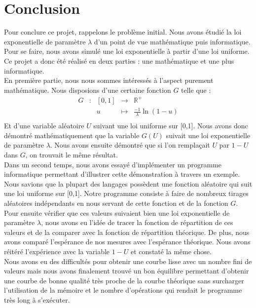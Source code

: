 \documentclass[12,french]{report}
\begin{document}
\chapter*{Conclusion}

Pour conclure ce projet, rappelons le problème initial. Nous avons étudié la loi exponentielle de paramètre $\lambda$ d'un point de vue mathématique puis informatique. Pour se faire, nous avons simulé une loi exponentielle à partir d'une loi uniforme. Ce projet a donc été réalisé en deux parties : une mathématique et une plus informatique.\\

En première partie, nous nous sommes intéressés à l'aspect purement mathématique. Nous disposions d'une certaine fonction $G$ telle que :
$$\begin{array}{ccccc}
	G & : & [0,1] & \longrightarrow & \mathbb{R}^{+} \\
	& & u & \longmapsto & \frac{-1}{\lambda}\ln(1-u) \\
\end{array}$$ 
Et d'une variable aléatoire $U$ suivant une loi uniforme sur [0,1]. Nous avons donc démontré mathématiquement que la variable $G(U)$ suivait une loi exponentielle de paramètre $\lambda$. Nous avons ensuite démontré que si l'on remplaçait $U$ par $1-U$ dans $G$, on trouvait le même résultat.\\

Dans un second temps, nous avons essayé d'implémenter un programme informatique permettant d'illustrer cette démonstration à travers un exemple. Nous savions que la plupart des langages possèdent une fonction aléatoire qui suit une loi uniforme sur [0,1]. Notre programme consiste à faire de nombreux tirages aléatoires indépendants en nous servant de cette fonction et de la fonction $G$. Pour ensuite vérifier que ces valeurs suivaient bien une loi exponentielle de paramètre $\lambda$, nous avons eu l'idée de tracer la fonction de répartition de ces valeurs et de la comparer avec la fonction de répartition théorique. De plus, nous avons comparé l'espérance de nos mesures avec l'espérance théorique. Nous avons réitéré l'expérience avec la variable $1-U$ et constaté la même chose.\\

Nous avons eu des difficultés pour obtenir une courbe lisse avec un nombre fini de valeurs mais nous avons finalement trouvé un bon équilibre permettant d'obtenir une courbe de bonne qualité très proche de la courbe théorique sans surcharger l'utilisation de la mémoire et le nombre d'opérations qui rendait le programme très long à s'exécuter.\\
\end{document}

